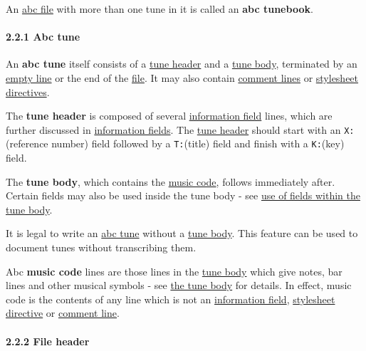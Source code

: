 \documentclass[oneside]{book}
\let\oldparagraph\paragraph
\renewcommand{\paragraph}[1]{\oldparagraph{#1}\mbox{}}
\begin{document}
\href{}{}An \protect\hyperlink{abc_file_definition}{abc file} with more
than one tune in it is called an \textbf{abc tunebook}.

\hypertarget{abc_tune}{\paragraph{2.2.1 Abc tune}\label{abc_tune}}

\href{}{}An \textbf{abc tune} itself consists of a
\protect\hyperlink{tune_header_definition}{tune header} and a
\protect\hyperlink{tune_body_definition}{tune body}, terminated by an
\protect\hyperlink{empty_line_definition}{empty line} or the end of the
\protect\hyperlink{abc_file_definition}{file}. It may also contain
\protect\hyperlink{comment_definition}{comment lines} or
\protect\hyperlink{stylesheet_directive_definition}{stylesheet
directives}.

\href{}{}The \textbf{tune header} is composed of several
\protect\hyperlink{information_field_definition}{information field}
lines, which are further discussed in
\protect\hyperlink{information_fields}{information fields}. The
\protect\hyperlink{tune_header_definition}{tune header} should start
with an \texttt{X:}(reference number) field followed by a
\texttt{T:}(title) field and finish with a \texttt{K:}(key) field.

\href{}{}The \textbf{tune body}, which contains the
\protect\hyperlink{music_code_definition}{music code}, follows
immediately after. Certain fields may also be used inside the tune body
- see \protect\hyperlink{use_of_fields_within_the_tune_body}{use of
fields within the tune body}.

It is legal to write an \protect\hyperlink{abc_tune_definition}{abc
tune} without a \protect\hyperlink{tune_body_definition}{tune body}.
This feature can be used to document tunes without transcribing them.

\href{}{}Abc \textbf{music code} lines are those lines in the
\protect\hyperlink{tune_body_definition}{tune body} which give notes,
bar lines and other musical symbols - see
\protect\hyperlink{the_tune_body}{the tune body} for details. In effect,
music code is the contents of any line which is not an
\protect\hyperlink{information_field_definition}{information field},
\protect\hyperlink{stylesheet_directive_definition}{stylesheet
directive} or \protect\hyperlink{comment_definition}{comment line}.

\hypertarget{file_header}{\paragraph{2.2.2 File
header}\label{file_header}}
\end{document}
